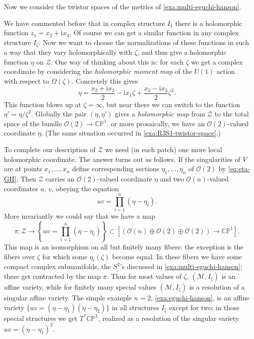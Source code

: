 \documentclass[12pt,letterpaper,reqno]{article}
\numberwithin{equation}{section}
\newcommand{\cZ}{\ensuremath{\mathcal Z}}
\newcommand{\cM}{\ensuremath{\mathcal M}}
\newcommand{\cO}{\ensuremath{\mathcal O}}
\newcommand{\C}{\ensuremath{\mathbb C}}
\newcommand{\PP}{\ensuremath{\mathbb P}}
\newcommand{\I}{{\mathrm i}}
\newcommand{\ti}[1]{\textit{#1}}
\begin{document}
\begin{example} \label{exa:multi-eguchi-hanson-twistor}
Now we consider the twistor spaces of the metrics
of \autoref{exa:multi-eguchi-hanson}.

We have commented before that in complex structure $I_1$ there
is a holomorphic function $z_1 = x_2 + \I x_3$.
Of course we can get a similar function in any complex structure
$I_\zeta$.
Now we want to choose the normalizations of these functions
in such a way that they vary holomorphically with $\zeta$, and thus give
a holomorphic function $\eta$ on $\cZ$.
One way of thinking about this is:
for each $\zeta$ we get a complex coordinate by considering
the \ti{holomorphic moment map} of the $U(1)$ action
with respect to $\Omega(\zeta)$. Concretely this gives
\begin{equation} \label{eq:eta-GH}
  \eta = \frac{x_2 + \I x_3}{2} - \I x_1 \zeta + \frac{x_2 - \I x_3}{2} \zeta^2.
\end{equation}
This function blows up at $\zeta = \infty$, but near there we can
switch to the function $\eta' = \eta / \zeta^2$. Globally the pair
$(\eta,\eta')$ gives a \ti{holomorphic map}
from $\cZ$ to the total space of the bundle
$\cO(2) \to \C\PP^1$. or more prosaically, we have an $\cO(2)$-valued
coordinate $\eta$. (The same situation occurred in \autoref{exa:R3S1-twistor-space}.)

To complete our description of $\cZ$ we need (in each patch) one more local holomorphic coordinate. The answer turns out as follows.
If the singularities of $V$ are at points $x_1, \dots, x_n$ define
corresponding sections $\eta_1, \dots, \eta_n$ of $\cO(2)$ by
\eqref{eq:eta-GH}. Then $\cZ$ carries an $\cO(2)$-valued
coordinate $\eta$ and two $\cO(n)$-valued coordinates $u$, $v$,
obeying the equation
\begin{equation} \label{eq:multi-eh-uv}
  uv = \prod_{i=1}^n (\eta - \eta_i).
\end{equation}
More invariantly we could say that we have a map
\begin{equation}
 \pi: \cZ \to \left\{ uv = \prod_{i=1}^n (\eta - \eta_i) \right\} \subset [(\cO(n) \oplus \cO(2) \oplus \cO(2)) \to \C\PP^1].
\end{equation}
This map is an isomorphism on all but finitely many fibers:
the exception is the fibers over $\zeta$ for which some $\eta_i(\zeta)$ become
equal. In these fibers we have some compact complex submanifolds,
the $S^2$'s discussed in \autoref{exa:multi-eguchi-hanson};
these get contracted by the map $\pi$. Thus for most values of $\zeta$,
$(\cM, I_\zeta)$ is an affine variety, while for finitely many special
values $(\cM, I_\zeta)$ is a resolution of a singular affine variety.
The simple example $n=2$, \autoref{exa:eguchi-hanson}, is an affine variety
$\{uv = (\eta - \eta_1)(\eta - \eta_2)\}$ in all structures $I_\zeta$ except
for two; in those special structures we get
$T^* \C\PP^1$, realized as a resolution of the singular
variety $uv = (\eta - \eta_1)^2$.


\end{example}
\end{document}
